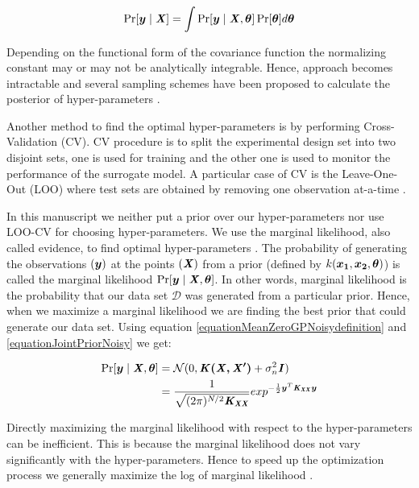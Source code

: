 \begin{equation}
    \Pr[\boldsymbol{y} \mid \bm{\mathit{X}}] = \int \Pr[\boldsymbol{y} \mid \bm{\mathit{X}}, \boldsymbol{\theta}]\Pr[\boldsymbol{\theta}]d\boldsymbol{\theta}
\end{equation}

Depending on the functional form of the covariance function the normalizing constant may or may not be analytically integrable. Hence, approach becomes intractable and several sampling schemes have been proposed to calculate the posterior of hyper-parameters \cite{osborne2010bayesian, neal2011mcmc}.

Another method to find the optimal hyper-parameters is by performing Cross-Validation (CV). CV procedure is to split the experimental design set into two disjoint sets, one is used for training and the other one is used to monitor the performance of the surrogate model. A particular case of CV is the Leave-One-Out (LOO) where test sets are obtained by removing one observation at-a-time \cite{rasmussen2006gaussian, dubrule1983cross, le2013multi}. 

In this manuscript we neither put a prior over our hyper-parameters nor use LOO-CV for choosing hyper-parameters. We use the marginal likelihood, also called evidence, to find optimal hyper-parameters \cite{mackay2003information}. The probability of generating the observations $(\boldsymbol{y})$ at the points $(\bm{\mathit{X}})$ from a prior (defined by $k(\boldsymbol{x_1}, \boldsymbol{x_2}, \boldsymbol{\theta})$) is called the marginal likelihood $\Pr[\boldsymbol{y} \mid \bm{\mathit{X}}, \boldsymbol{\theta}]$. In other words, marginal likelihood is the probability that our data set $\mathcal{D}$ was generated from a particular prior. Hence, when we maximize a marginal likelihood we are finding the best prior that could generate our data set. Using equation \ref{equationMeanZeroGPNoisydefinition} and \ref{equationJointPriorNoisy} we get:

\begin{equation}\label{equationMarginalLikelihood}
\begin{aligned}
\Pr[\boldsymbol{y} \mid \bm{\mathit{X}}, \boldsymbol{\theta}] & = \mathcal{N}(0 , \bm{\mathit{K(X, X')}} + \sigma^{2}_{n}\bm{\mathit{I}})  \\
& = \frac{1}{\sqrt{(2\pi)^{N/2} \bm{\mathit{K_{XX}}}}} exp^{-\frac{1}{2}\boldsymbol{y}^{T}\bm{\mathit{K_{XX}}}\boldsymbol{y}}
\end{aligned}
\end{equation}

Directly maximizing the marginal likelihood with respect to the hyper-parameters can be inefficient. This is because the marginal likelihood does not vary significantly with the hyper-parameters. Hence to speed up the optimization process we generally maximize the log of marginal likelihood \cite{rasmussen2006gaussian}. 

